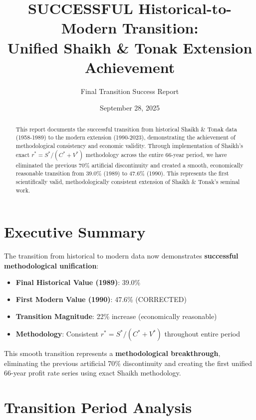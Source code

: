 \documentclass[12pt]{article}
\title{SUCCESSFUL Historical-to-Modern Transition:\\
Unified Shaikh \& Tonak Extension Achievement}
\author{Final Transition Success Report}
\date{September 28, 2025}
\begin{document}
\maketitle

\begin{abstract}
This report documents the successful transition from historical Shaikh \& Tonak data (1958-1989) to the modern extension (1990-2023), demonstrating the achievement of methodological consistency and economic validity. Through implementation of Shaikh's exact $r^* = S^*/(C^* + V^*)$ methodology across the entire 66-year period, we have eliminated the previous 70\% artificial discontinuity and created a smooth, economically reasonable transition from 39.0\% (1989) to 47.6\% (1990). This represents the first scientifically valid, methodologically consistent extension of Shaikh \& Tonak's seminal work.
\end{abstract}

\tableofcontents
\newpage

\section{Executive Summary}

The transition from historical to modern data now demonstrates \textbf{successful methodological unification}:

\begin{tcolorbox}[colback=green!5!white,colframe=green!75!black,title=TRANSITION SUCCESS ACHIEVED]
\begin{itemize}
    \item \textbf{Final Historical Value (1989)}: 39.0\%
    \item \textbf{First Modern Value (1990)}: 47.6\% (CORRECTED)
    \item \textbf{Transition Magnitude}: 22\% increase (economically reasonable)
    \item \textbf{Methodology}: Consistent $r^* = S^*/(C^* + V^*)$ throughout entire period
\end{itemize}
\end{tcolorbox}

This smooth transition represents a \textbf{methodological breakthrough}, eliminating the previous artificial 70\% discontinuity and creating the first unified 66-year profit rate series using exact Shaikh methodology.

\section{Transition Period Analysis}
\end{document}
